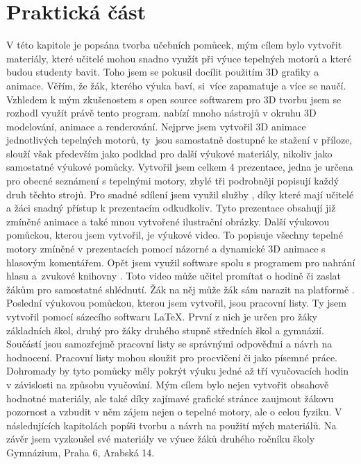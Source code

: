 \section{Praktická část}
{V této kapitole je popsána tvorba učebních pomůcek, mým cílem bylo vytvořit materiály, které učitelé mohou snadno využít při výuce tepelných motorů a které budou studenty bavit. Toho jsem se pokusil docílit použitím 3D grafiky a animace. Věřím, že žák, kterého výuka baví, si~více zapamatuje a více se naučí.}\odst
{Vzhledem k mým zkušenostem s open source softwarem  pro 3D tvorbu jsem se rozhodl využít právě tento program.  nabízí mnoho nástrojů v okruhu 3D modelování, animace a renderování. Nejprve jsem vytvořil 3D animace jednotlivých tepelných motorů, ty~jsou samostatně dostupné ke stažení v příloze, slouží však především jako podklad pro další výukové materiály, nikoliv jako samostatné výukové pomůcky.}\odst
{Vytvořil jsem celkem 4 prezentace, jedna je určena pro obecné seznámení s tepelnými motory, zbylé tři podrobněji popisují každý druh těchto strojů. Pro snadné sdílení jsem využil služby , díky které mají učitelé a žáci snadný přístup k prezentacím odkudkoliv. Tyto prezentace obsahují již zmíněné animace a také mnou vytvořené ilustrační obrázky.}\odst
{Další výukovou pomůckou, kterou jsem vytvořil, je výukové video. To popisuje všechny tepelné motory zmíněné v prezentacích pomocí názorné a dynamické 3D animace s hlasovým komentářem. Opět jsem využil software  spolu s programem  pro nahrání hlasu a~zvukové knihovny . Toto video může učitel promítat o hodině či zaslat žákům pro samostatné shlédnutí. Žák na něj může žák sám narazit na platformě .}\odst
{Poslední výukovou pomůckou, kterou jsem vytvořil, jsou pracovní listy. Ty jsem vytvořil pomocí sázecího softwaru \LaTeX. První z nich je určen pro žáky základních škol, druhý pro žáky druhého stupně středních škol a gymnázií. Součástí jsou samozřejmě pracovní listy se správnými odpověďmi a návrh na hodnocení. Pracovní listy mohou sloužit pro procvičení či jako písemné práce.}\odst
{Dohromady by tyto pomůcky měly pokrýt výuku jedné až tří vyučovacích hodin v závislosti na způsobu vyučování. Mým cílem bylo nejen vytvořit obsahově hodnotné materiály, ale také díky zajímavé grafické stránce zaujmout žákovu pozornost a vzbudit v něm zájem nejen o tepelné motory, ale o celou fyziku. V následujících kapitolách popíši tvorbu a návrh na použití mých materiálů. Na závěr jsem vyzkoušel své materiály ve výuce žáků druhého ročníku školy Gymnázium, Praha 6, Arabská 14.}